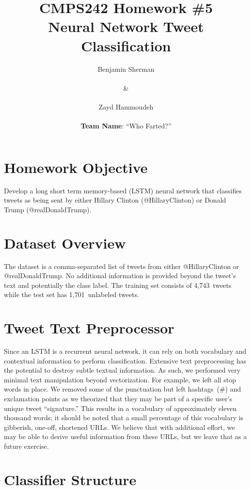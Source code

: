 \documentclass{report}
\title{\textbf{CMPS242 Homework \#5 \textendash{} \\Neural Network Tweet Classification}}
\author{Benjamin Sherman \\~\\ \& \\~\\ Zayd Hammoudeh \\~\\ \textbf{Team Name}: ``Who Farted?''}
\date{} %
\begin{document}
  \maketitle
  
  \suppressfloats %
  \section{Homework Objective}
  
  Develop a long short term memory-based (LSTM) neural network that classifies tweets as being sent by either Hillary Clinton (@HillaryClinton) or Donald Trump (@realDonaldTrump).
  
  \section{Dataset Overview}
  
  The dataset is a comma-separated list of tweets from either @HillaryClinton or @realDonaldTrump.  No additional information is provided beyond the tweet's text and potentially the class label.  The training set consists of 4,743~tweets while the test set has 1,701~unlabeled tweets.
   
  \section{Tweet Text Preprocessor}\label{sec:textPreprocessor}
  
  Since an LSTM is a recurrent neural network, it can rely on both vocabulary and contextual information to perform classification.  Extensive text preprocessing has the potential to destroy subtle textual information.  As such, we performed very minimal text manipulation beyond vectorization.  For example, we left all stop words in place.  We removed some of the punctuation but left hashtags~(\#) and exclamation points as we theorized that they may be part of a specific user's unique tweet ``signature.''  This results in a vocabulary of approximately eleven thousand words; it should be noted that a small percentage of this vocabulary is gibberish, one-off, shortened URLs.  We believe that with additional effort, we may be able to derive useful information from these URLs, but we leave that as a future exercise.
   
  \section{Classifier Structure}
  
\end{document}

